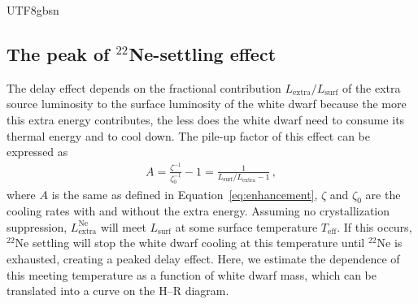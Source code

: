 \documentclass[twocolumn, times, trackchanges]{aastex63_bren}
\begin{document}
\begin{CJK*}{UTF8}{gbsn}
\begin{appendix}
\section[The peak of 22Ne-settling effect]{The peak of $^{22}$Ne-settling effect}
\label{app:22Ne}

The delay effect depends on the fractional contribution $L_\text{extra}/L_\text{surf}$ of the extra source luminosity to the surface luminosity of the white dwarf because the more this extra energy contributes, the less does the white dwarf need to consume its thermal energy and to cool down. The pile-up factor of this effect can be expressed as
\begin{align}
\label{eq:22Ne}
    A = \frac{\zeta^{-1}}{\zeta_0^{-1}}-1 = \frac{1}{L_\text{surf}/L_\text{extra}-1}\,,
\end{align}
where $A$ is the same as defined in Equation~\ref{eq:enhancement}, $\zeta$ and $\zeta_0$ are the cooling rates with and without the extra energy. Assuming no crystallization suppression, $L^\text{Ne}_\text{extra}$ will meet $L_\text{surf}$ at some surface temperature $T_\text{eff}$. If this occurs, $^{22}$Ne settling will stop the white dwarf cooling at this temperature until $^{22}$Ne is exhausted, creating a peaked delay effect. Here, we estimate the dependence of this meeting temperature as a function of white dwarf mass, which can be translated into a curve on the H--R diagram. 


\end{appendix}
\end{CJK*}
\end{document}
